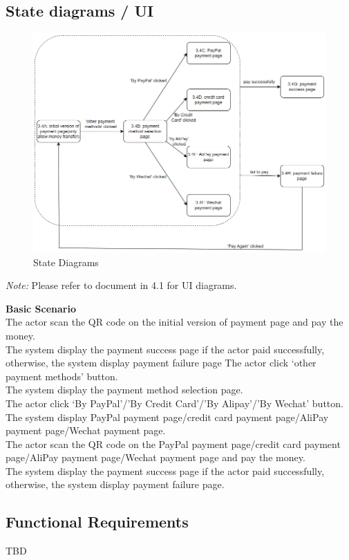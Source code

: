 \subsection{State diagrams / UI}
\begin{figure}[H]
    \centering
    \includegraphics[width=0.75\linewidth]{picture/12312323.png}
    \caption{State Diagrams}
    \label{fig:enter-label}
\end{figure}

\textit{Note:} Please refer to document in 4.1 for UI diagrams.

\textbf{Basic Scenario} \\
The actor scan the QR code on the initial version of payment page and pay the money. \\
The system display the payment success page if the actor paid successfully, otherwise, the system display payment failure page
The actor click ‘other payment methods’ button. \\
The system display the payment method selection page. \\
The actor click ‘By PayPal’/’By Credit Card’/’By Alipay’/’By Wechat’ button.\\
The system display PayPal payment page/credit card payment page/AliPay payment page/Wechat payment page. \\
The actor scan the QR code on the PayPal payment page/credit card payment page/AliPay payment page/Wechat payment page and pay the money.\\
The system display the payment success page if the actor paid successfully, otherwise, the system display payment failure page.


\subsection{Functional Requirements}
TBD


